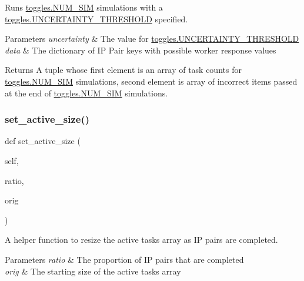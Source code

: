 Runs \mbox{\hyperlink{namespacedynamicfilterapp_1_1toggles_a3baf5565851cd87736238d8dddfc1106}{toggles.\+N\+U\+M\+\_\+\+S\+IM}} simulations with a \mbox{\hyperlink{namespacedynamicfilterapp_1_1toggles_aaefdc27b85545eb4a910f5c65f7d8bbb}{toggles.\+U\+N\+C\+E\+R\+T\+A\+I\+N\+T\+Y\+\_\+\+T\+H\+R\+E\+S\+H\+O\+LD}} specified. 


\begin{DoxyParams}{Parameters}
{\em uncertainty} & The value for \mbox{\hyperlink{namespacedynamicfilterapp_1_1toggles_aaefdc27b85545eb4a910f5c65f7d8bbb}{toggles.\+U\+N\+C\+E\+R\+T\+A\+I\+N\+T\+Y\+\_\+\+T\+H\+R\+E\+S\+H\+O\+LD}} \\
\hline
{\em data} & The dictionary of IP Pair keys with possible worker response values \\
\hline
\end{DoxyParams}
\begin{DoxyReturn}{Returns}
A tuple whose first element is an array of task counts for \mbox{\hyperlink{namespacedynamicfilterapp_1_1toggles_a3baf5565851cd87736238d8dddfc1106}{toggles.\+N\+U\+M\+\_\+\+S\+IM}} simulations, second element is array of incorrect items passed at the end of \mbox{\hyperlink{namespacedynamicfilterapp_1_1toggles_a3baf5565851cd87736238d8dddfc1106}{toggles.\+N\+U\+M\+\_\+\+S\+IM}} simulations. 
\end{DoxyReturn}
\mbox{\label{classdynamicfilterapp_1_1test__simulations_1_1_simulation_test_a966a3c31662ba0c8c2d3d095899ec1ad}} 
\subsubsection{\texorpdfstring{set\_active\_size()}{set\_active\_size()}}
{\footnotesize\ttfamily def set\+\_\+active\+\_\+size (\begin{DoxyParamCaption}\item[{}]{self,  }\item[{}]{ratio,  }\item[{}]{orig }\end{DoxyParamCaption})}



A helper function to resize the active tasks array as IP pairs are completed. 


\begin{DoxyParams}{Parameters}
{\em ratio} & The proportion of IP pairs that are completed \\
\hline
{\em orig} & The starting size of the active tasks array \\
\hline
\end{DoxyParams}
\mbox{\label{classdynamicfilterapp_1_1test__simulations_1_1_simulation_test_aad2d8e9dd7aa97a8929ef0f348af5f52}} 
